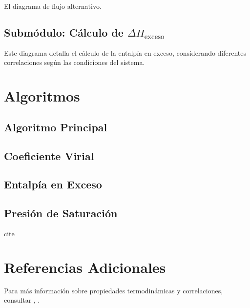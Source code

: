 \documentclass[12pt, oneside]{book}
\begin{document}
    

    El diagrama de flujo alternativo.
    

    \newpage
    \subsection{Submódulo: Cálculo de $\Delta H_{\text{exceso}}$}
    \label{sec:flowchart_submodule}
    
    Este diagrama detalla el cálculo de la entalpía en exceso, considerando diferentes correlaciones según las condiciones del sistema.

    

    \section{Algoritmos}

    \subsection{Algoritmo Principal}
    \label{sec:algo_main}

    


    \newpage
    \subsection{Coeficiente Virial}
    \label{sec:algo_virial}

    

    \newpage
    \subsection{Entalpía en Exceso}
    \label{sec:algo_excess}

    

    \newpage
    \subsection{Presión de Saturación}
    \label{sec:algo_saturation}cite

    


    \section{Referencias  Adicionales}

    Para más información sobre propiedades termodinámicas y correlaciones, consultar \parencite{bib:PolingPrausnitz2001}, \parencite{RowlinsonSwinton1982}.


    \printbibliography[title=Referencias]
\end{document}
